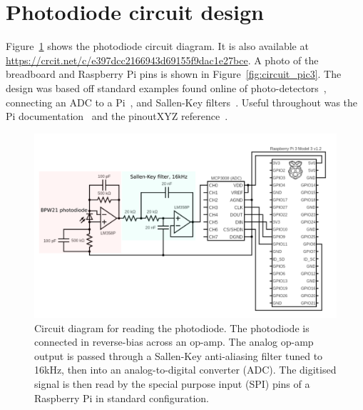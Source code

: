 \documentclass[paper-main.tex]{subfiles}
\begin{document}


\section{Photodiode circuit design}
\label{app:circuit_diagram}

Figure~\ref{fig:circuit_diagram} shows the photodiode circuit diagram. 
It is also available at \url{https://crcit.net/c/e397dcc2166943d69155f9dac1e27bce}. A photo of the breadboard and Raspberry Pi pins is shown in Figure~\ref{fig:circuit_pic3}. The design was based off standard examples found online of photo-detectors~\cite{photodiodecircuits1:online,photodiodecircuits2:online}, connecting an ADC to a Pi~\cite{piadcguide:online}, and Sallen-Key filters~\cite{sallenkey1:online,sallenkey2:online}. Useful throughout was the Pi documentation~\cite{pidocumentation:online} and the pinoutXYZ reference~\cite{pipinout:online}.


\begin{figure}
	\includegraphics[width=.65\textwidth]{figures/circuit_diagram_2.pdf}
	\caption{\label{fig:circuit_diagram}
Circuit diagram for reading the photodiode. 
The photodiode is connected in reverse-bias across an op-amp. 
The analog op-amp output is passed through a Sallen-Key anti-aliasing filter tuned to 16kHz, then into an analog-to-digital converter (ADC). 
The digitised signal is then read by the special purpose input (SPI) pins of a Raspberry Pi in standard configuration.
}
\end{figure}
\end{document}
